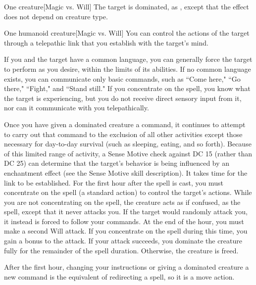 \spellrng{\rngmed}
\begin{spelltarget}{One creature}[Magic vs. Will]
    \spellsuccess The target is dominated, as , except that the effect does not depend on creature type.
\end{spelltarget}

\spellrng{\rngmed}
\begin{spelltarget}{One humanoid creature}[Magic vs. Will]
    \spellsuccess You can control the actions of the target through a telepathic link that you establish with the target's mind.
    \par If you and the target have a common language, you can generally force the target to perform as you desire, within the limits of its abilities. If no common language exists, you can communicate only basic commands, such as ``Come here," ``Go there," ``Fight," and ``Stand still." If you concentrate on the spell, you know what the target is experiencing, but you do not receive direct sensory input from it, nor can it communicate with you telepathically.
    \par Once you have given a dominated creature a command, it continues to attempt to carry out that command to the exclusion of all other activities except those necessary for day-to-day survival (such as sleeping, eating, and so forth). Because of this limited range of activity, a Sense Motive check against DC 15 (rather than DC 25) can determine that the target's behavior is being influenced by an enchantment effect (see the Sense Motive skill description).
    It takes time for the link to be established. For the first hour after the spell is cast, you must concentrate on the spell (a standard action) to control the target's actions. While you are not concentrating on the spell, the creature acts as if confused, as the  spell, except that it never attacks you. If the target would randomly attack you, it instead is forced to follow your commands. At the end of the hour, you must make a second Will attack. If you concentrate on the spell during this time, you gain a  bonus to the attack. If your attack succeeds, you dominate the creature fully for the remainder of the spell duration. Otherwise, the creature is freed.
    \par After the first hour, changing your instructions or giving a dominated creature a new command is the equivalent of redirecting a spell, so it is a move action.

\end{spelltarget}
